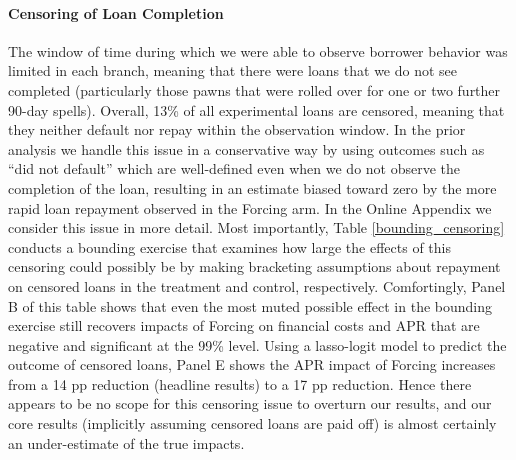 \documentclass[12pt, a4paper]{article}
\begin{document}
\paragraph*{Censoring of Loan Completion}
The window of time during which we were able to observe borrower behavior was limited in each branch, meaning that there were loans that we do not see completed (particularly those pawns that were rolled over for one or two further 90-day spells).  Overall, 13\% of all experimental loans are censored, meaning that they neither default nor repay within the observation window.  In the prior analysis we handle this issue in a conservative way by using outcomes such as ``did not default'' which are well-defined even when we do not observe the completion of the loan, resulting in an estimate biased toward zero by the more rapid loan repayment observed in the Forcing arm.  In the Online Appendix we consider this issue in more detail.  Most importantly, Table \ref{bounding_censoring} conducts a bounding exercise that examines how large the effects of this censoring could possibly be by making bracketing assumptions about repayment on censored loans in the treatment and control, respectively.  Comfortingly, Panel B of this table shows that even the most muted possible effect in the bounding exercise still recovers impacts of Forcing on financial costs and APR that are negative and significant at the 99\% level.  Using a lasso-logit model to predict the outcome of censored loans, Panel E shows the APR impact of Forcing increases from a 14 pp reduction (headline results) to a 17 pp reduction.  Hence there appears to be no scope for this censoring issue to overturn our results, and our core results (implicitly assuming censored loans are paid off) is almost certainly an under-estimate of the true impacts.
\end{document}
